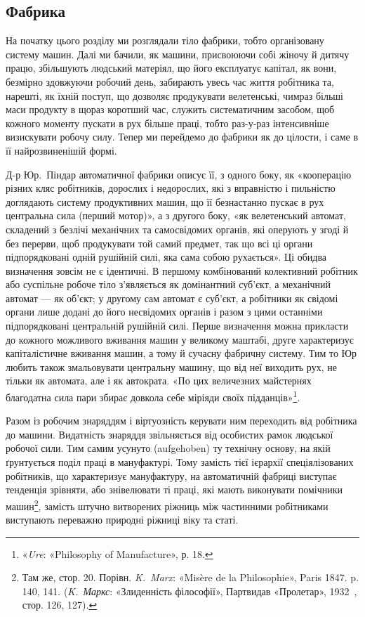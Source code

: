 \subsection{Фабрика}
\vspace{-\medskipamount}

На початку цього розділу ми розглядали тіло фабрики, тобто
організовану систему машин. Далі ми бачили, як машини, присвоюючи
собі жіночу й дитячу працю, збільшують людський
матеріял, що його експлуатує капітал, як вони, безмірно здовжуючи
робочий день, забирають увесь час життя робітника та,
нарешті, як їхній поступ, що дозволяє продукувати велетенські,
чимраз більші маси продукту в щораз коротший час, служить
систематичним засобом, щоб кожного моменту пускати в рух
більше праці, тобто раз-у-раз інтенсивніше визискувати робочу
силу. Тепер ми перейдемо до фабрики як до цілости, і саме в її
найрозвиненішій формі.

Д-р Юр.~Піндар автоматичної фабрики описує її, з одного
боку, як «кооперацію різних кляс робітників, дорослих і недорослих,
які з вправністю і пильністю доглядають систему продуктивних
машин, що її безнастанно пускає в рух центральна
сила (перший мотор)», а з другого боку, «як велетенський автомат,
складений з безлічі механічних та самосвідомих органів,
які оперують у згоді й без перерви, щоб продукувати той самий
предмет, так що всі ці органи підпорядковані одній рушійній
силі, яка сама собою рухається». Ці обидва визначення зовсім
не є ідентичні. В першому комбінований колективний робітник
або суспільне робоче тіло з’являється як домінантний суб’єкт,
а механічний автомат — як об’єкт; у другому сам автомат є
суб’єкт, а робітники як свідомі органи лише додані до його
несвідомих органів і разом з цими останніми підпорядковані
центральній рушійній силі. Перше визначення можна прикласти
до кожного можливого вживання машин у великому маштабі,
друге характеризує капіталістичне вживання машин, а тому й
сучасну фабричну систему. Тим то Юр любить також змальовувати
центральну машину, що від неї виходить рух, не тільки як
автомата, але і як автократа. «По цих величезних майстернях
благодатна сила пари збирає довкола себе міріяди своїх підданців»\footnote{
«\emph{Ure}: «Philosophy of Manufacture», р. 18.
}.

Разом із робочим знаряддям і віртуозність керувати ним
переходить від робітника до машини. Видатність знаряддя звільняється
від особистих рамок людської робочої сили. Тим самим
усунуто (aufgehoben) ту технічну основу, на якій ґрунтується
поділ праці в мануфактурі. Тому замість тієї ієрархії спеціялізованих
робітників, що характеризує мануфактуру, на автоматичній
фабриці виступає тенденція зрівняти, або знівелювати ті
праці, які мають виконувати помічники машин\footnote{
Там же, стор. 20. Порівн. \emph{K.~Marx}: «Misère de la Philosophie»,
Paris 1847. p. 140, 141. (\emph{K.~Маркс}: «Злиденність філософії», Партвидав
«Пролетар», 1932~, стор. 126, 127).
}, замість штучно
витворених ріжниць між частинними робітниками виступають
переважно природні ріжниці віку та статі.


